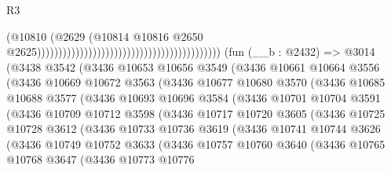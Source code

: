 \begin{lexlean}{R3}
\begin{coremodule}
                                                                                    (@10810
                                                                                      (@2629
                                                                                        (@10814
                                                                                          @10816
                                                                                          @2650
                                                                                          @2625)))))))))))))))))))))))))))))))))))))))))))
    (fun (__b : @2432) =>
    @3014
      (@3438
        @3542
        (@3436
          @10653
          @10656
          @3549
          (@3436
            @10661
            @10664
            @3556
            (@3436
              @10669
              @10672
              @3563
              (@3436
                @10677
                @10680
                @3570
                (@3436
                  @10685
                  @10688
                  @3577
                  (@3436
                    @10693
                    @10696
                    @3584
                    (@3436
                      @10701
                      @10704
                      @3591
                      (@3436
                        @10709
                        @10712
                        @3598
                        (@3436
                          @10717
                          @10720
                          @3605
                          (@3436
                            @10725
                            @10728
                            @3612
                            (@3436
                              @10733
                              @10736
                              @3619
                              (@3436
                                @10741
                                @10744
                                @3626
                                (@3436
                                  @10749
                                  @10752
                                  @3633
                                  (@3436
                                    @10757
                                    @10760
                                    @3640
                                    (@3436
                                      @10765
                                      @10768
                                      @3647
                                      (@3436
                                        @10773
                                        @10776

\end{coremodule}
\end{lexlean}
